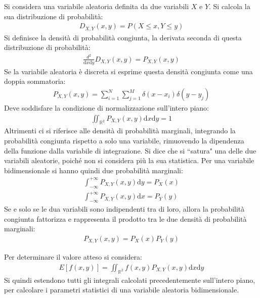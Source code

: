 \documentclass{article}
\newcommand{\df}{\mathrm{d}}
\numberwithin{equation}{subsection}
\begin{document}
Si considera una variabile aleatoria definita da due variabili $X$ e $Y$. Si calcola la sua distribuzione di probabilità:
\begin{gather*}
    D_{X,Y}(x,y)=P(X\leq x,Y\leq y)
\end{gather*}
Si definisce la densità di probabilità congiunta, la derivata seconda di questa distribuzione di probabilità:
\begin{gather*}
    \displaystyle\frac{d^2}{\df x\df y}D_{X,Y}(x,y)=P_{X,Y}(x,y)
\end{gather*}
Se la variabile aleatoria è discreta si esprime questa densità congiunta come una doppia sommatoria:
\begin{gather*}
    P_{X,Y}(x,y)=\displaystyle\sum_{i=1}^N\sum_{j=1}^M\delta(x-x_i)\delta(y-y_j)
\end{gather*}
Deve soddisfare la condizione di normalizzazione sull'intero piano:
\begin{gather*}
    \iint_{\mathbb{R}^2}P_{X,Y}(x,y)\df x\df y=1
\end{gather*}
Altrimenti ci si riferisce alle densità di probabilità marginali, integrando la probabilità congiunta rispetto a solo una variabile, rimuovendo la dipendenza della funzione 
dalla variabile di integrazione. Si dice che si ``satura" una delle due variabili aleatorie, poiché non si considera più la sua statistica. Per una variabile 
bidimensionale si hanno quindi due probabilità marginali:
\begin{gather*}
    \displaystyle\int_{-\infty}^{+\infty}P_{X,Y}(x,y)\df y=P_X(x)\\
    \displaystyle\int_{-\infty}^{+\infty}P_{X,Y}(x,y)\df x=P_Y(y)
\end{gather*}
Se e solo se le dua variabili sono indipendenti tra di loro, allora la probabilità congiunta fattorizza e rappresenta il prodotto tra le due densità di probabilità marginali:
\begin{gather*}
    P_{X,Y}(x,y)=P_X(x)P_Y(y)
\end{gather*}

Per determinare il valore atteso si considera:
\begin{gather*}
    E[f(x,y)]=\displaystyle\iint_{\mathbb{R}^2}f(x,y)P_{X,Y}(x,y)\df x\df y
\end{gather*}
Si quindi estendono tutti gli integrali calcolati precedentemente sull'intero piano, per calcolare i parametri statistici di una variabile aleatoria bidimensionale. 
\end{document}
